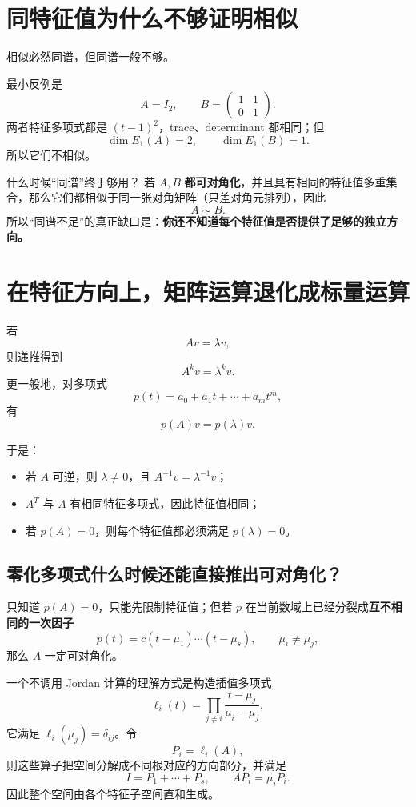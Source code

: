 \documentclass[11pt,a4paper]{ctexart}
\newcommand{\kw}[1]{\textbf{\color{deep}#1}}
\begin{document}
\section{同特征值为什么不够证明相似}

相似必然同谱，但同谱一般不够。

最小反例是
\[
A=I_2,
\qquad
B=\begin{pmatrix}1&1\\0&1\end{pmatrix}.
\]
两者特征多项式都是 $(t-1)^2$，trace、determinant 都相同；但
\[
\dim E_1(A)=2,
\qquad
\dim E_1(B)=1.
\]
所以它们不相似。

\begin{corebox}{什么时候“同谱”终于够用？}
若 $A,B$ \kw{都可对角化}，并且具有相同的特征值多重集合，那么它们都相似于同一张对角矩阵（只差对角元排列），因此
\[
\boxed{A\sim B.}
\]
所以“同谱不足”的真正缺口是：\kw{你还不知道每个特征值是否提供了足够的独立方向。}
\end{corebox}

\section{在特征方向上，矩阵运算退化成标量运算}

若
\[
Av=\lambda v,
\]
则递推得到
\[
A^kv=\lambda^k v.
\]
更一般地，对多项式
\[
p(t)=a_0+a_1t+\cdots+a_mt^m,
\]
有
\[
\boxed{p(A)v=p(\lambda)v.}
\]

于是：
\begin{itemize}
  \item 若 $A$ 可逆，则 $\lambda\neq0$，且 $A^{-1}v=\lambda^{-1}v$；
  \item $A^T$ 与 $A$ 有相同特征多项式，因此特征值相同；
  \item 若 $p(A)=0$，则每个特征值都必须满足 $p(\lambda)=0$。
\end{itemize}

\subsection{零化多项式什么时候还能直接推出可对角化？}

只知道 $p(A)=0$，只能先限制特征值；但若 $p$ 在当前数域上已经分裂成\kw{互不相同的一次因子}
\[
p(t)=c(t-\mu_1)\cdots(t-\mu_s),
\qquad \mu_i\neq\mu_j,
\]
那么 $A$ 一定可对角化。

一个不调用 Jordan 计算的理解方式是构造插值多项式
\[
\ell_i(t)=\prod_{j\neq i}\frac{t-\mu_j}{\mu_i-\mu_j},
\]
它满足 $\ell_i(\mu_j)=\delta_{ij}$。令
\[
P_i=\ell_i(A),
\]
则这些算子把空间分解成不同根对应的方向部分，并满足
\[
I=P_1+\cdots+P_s,
\qquad
AP_i=\mu_iP_i.
\]
因此整个空间由各个特征子空间直和生成。
\end{document}
